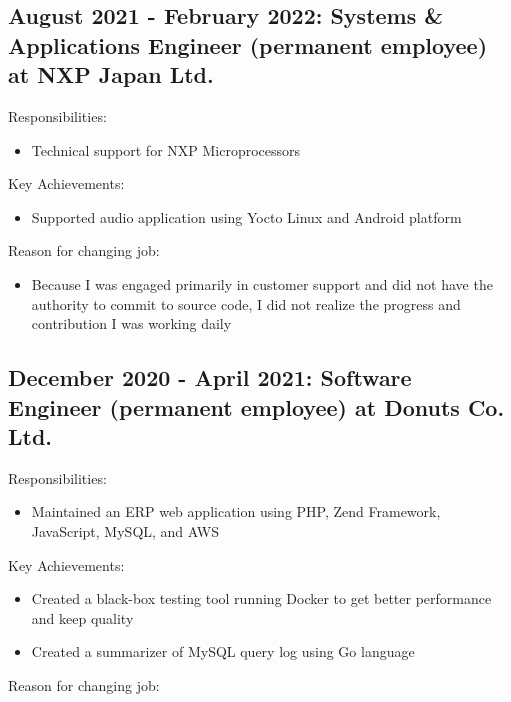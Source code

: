 \documentclass[letterpaper]{article}
\begin{document}
\subsection*{August 2021 - February 2022: Systems \& Applications Engineer  (permanent employee) at NXP Japan Ltd.}

\noindent Responsibilities:

\begin{itemize}
  \item Technical support for NXP Microprocessors
\end{itemize}

\noindent Key Achievements:

\begin{itemize}
  \item Supported audio application using Yocto Linux and Android platform
\end{itemize}

\noindent Reason for changing job:

\begin{itemize}
  \item Because I was engaged primarily in customer support and did not have the authority to commit to source code, I did not realize the progress and contribution I was working daily
\end{itemize}

\subsection*{December 2020 - April 2021: Software Engineer (permanent employee) at Donuts Co. Ltd.}

\noindent Responsibilities:

\begin{itemize}
  \item Maintained an ERP web application using PHP, Zend Framework, JavaScript, MySQL, and AWS
\end{itemize}

\noindent Key Achievements:

\begin{itemize}
  \item Created a black-box testing tool running Docker to get better performance and keep quality
  \item Created a summarizer of MySQL query log using Go language
\end{itemize}

\noindent Reason for changing job:
\end{document}
